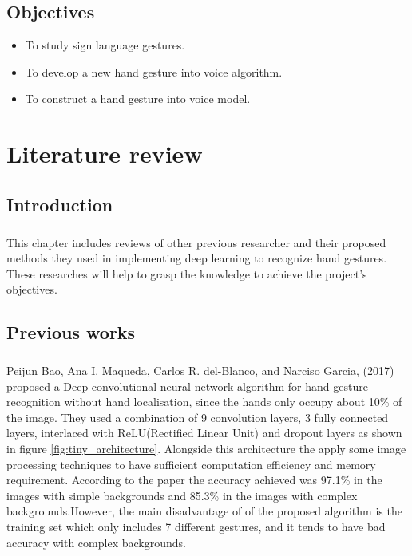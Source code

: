 \documentclass[12pt]{report}
\begin{document}
        \section{Objectives}
        \begin{itemize}
            \item To study sign language gestures.
            \item To develop a new hand gesture into voice algorithm.
            \item To construct a hand gesture into voice model.
        \end{itemize}    
    \chapter{Literature review}
        \section{Introduction}
            \paragraph{}
            This chapter includes reviews of other previous researcher
            and their proposed methods they used in implementing deep learning
            to recognize hand gestures. These researches will help to grasp the knowledge
            to achieve the project's objectives. 
        \section{Previous works}
            \paragraph{}
            Peijun Bao, Ana I. Maqueda, Carlos R. del-Blanco, and Narciso Garcia, 
            (2017) proposed a Deep convolutional neural network algorithm for hand-gesture 
            recognition without hand localisation, since the hands only occupy about 10\% of 
            the image. They used a combination of 9 convolution layers, 3 fully connected layers, 
            interlaced with ReLU(Rectified Linear Unit) and dropout layers as shown in 
            figure \ref{fig:tiny_architecture}. Alongside this architecture the apply some image 
            processing techniques to have sufficient computation efficiency and memory requirement.
            According to the paper the accuracy achieved was 97.1\% in the images with simple backgrounds
            and 85.3\% in the images with complex backgrounds.However, the main disadvantage of of 
            the proposed algorithm is the training set which only includes 7 different gestures,
            and it tends to have bad accuracy with complex backgrounds.
             
\end{document}
